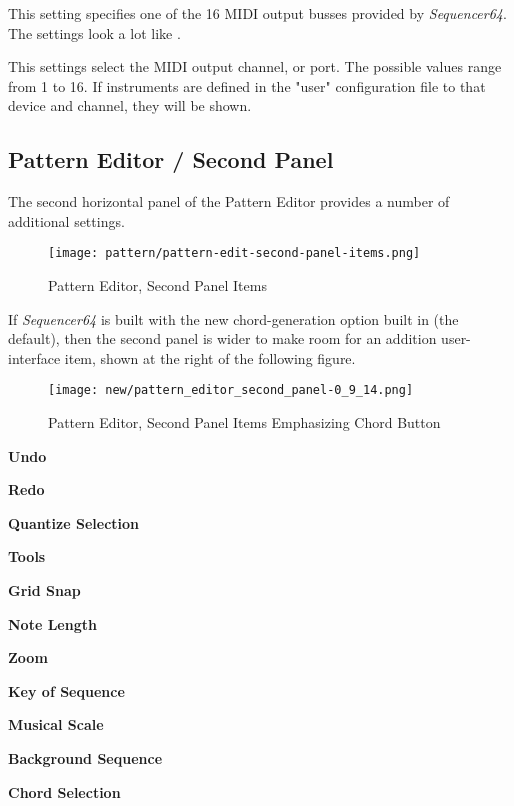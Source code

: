    This setting specifies one of the 16 MIDI output busses provided by
   \textsl{Sequencer64}.  The settings look a lot like
   .

   This settings select the MIDI output channel, or port.
   The possible values range from 1 to 16.
   If instruments are defined in the "user" configuration file
   to that device and channel, they will be shown.

\subsection{Pattern Editor / Second Panel}
\label{subsec:seq64_pattern_editor_second}

   The second horizontal panel of the Pattern Editor provides a number
   of additional settings.

\begin{figure}[H]
   \centering 
   \texttt{[image: pattern/pattern-edit-second-panel-items.png]}
   \caption{Pattern Editor, Second Panel Items}
   \label{fig:pattern_editor_main_panel_items}
\end{figure}

   If \textsl{Sequencer64} is built with the new chord-generation option
   built in (the default), then the second panel is wider to make room for an
   addition user-interface item, shown at the right of the following figure.

\begin{figure}[H]
   \centering 
   \texttt{[image: new/pattern\_editor\_second\_panel-0\_9\_14.png]}
   \caption{Pattern Editor, Second Panel Items Emphasizing Chord Button}
   \label{fig:pattern_editor_main_panel_items}
\end{figure}

   \begin{enumber}
      \item \textbf{Undo}
      \item \textbf{Redo}
      \item \textbf{Quantize Selection}
      \item \textbf{Tools}
      \item \textbf{Grid Snap}
      \item \textbf{Note Length}
      \item \textbf{Zoom}
      \item \textbf{Key of Sequence}
      \item \textbf{Musical Scale}
      \item \textbf{Background Sequence}
      \item \textbf{Chord Selection}
   \end{enumber}

